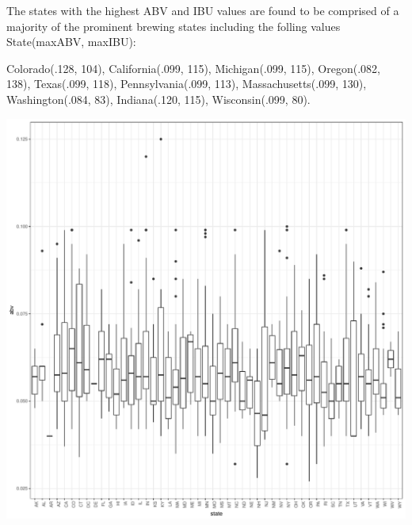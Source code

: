 \documentclass[]{article}
\newenvironment{Shaded}{\begin{snugshade}}{\end{snugshade}}
\newcommand{\KeywordTok}[1]{\textcolor[rgb]{0.13,0.29,0.53}{\textbf{#1}}}
\newcommand{\DataTypeTok}[1]{\textcolor[rgb]{0.13,0.29,0.53}{#1}}
\newcommand{\DecValTok}[1]{\textcolor[rgb]{0.00,0.00,0.81}{#1}}
\newcommand{\StringTok}[1]{\textcolor[rgb]{0.31,0.60,0.02}{#1}}
\newcommand{\CommentTok}[1]{\textcolor[rgb]{0.56,0.35,0.01}{\textit{#1}}}
\newcommand{\OperatorTok}[1]{\textcolor[rgb]{0.81,0.36,0.00}{\textbf{#1}}}
\newcommand{\NormalTok}[1]{#1}
\begin{document}
The states with the highest ABV and IBU values are found to be comprised
of a majority of the prominent brewing states including the folling
values State(maxABV, maxIBU):

Colorado(.128, 104), California(.099, 115), Michigan(.099, 115),
Oregon(.082, 138), Texas(.099, 118), Pennsylvania(.099, 113),
Massachusetts(.099, 130), Washington(.084, 83), Indiana(.120, 115),
Wisconsin(.099, 80).

\begin{Shaded}
\end{Shaded}

\begin{center}\includegraphics{Analysis_Final_files/figure-latex/unnamed-chunk-18-1} \end{center}
\end{document}
